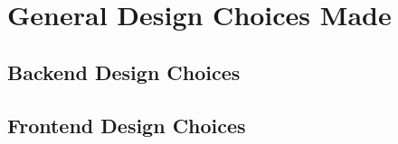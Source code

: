 \section[General Design Choices Made]{General Design Choices Made}\label{sec:newsec}

\subsection{Backend Design Choices}
\subsection{Frontend Design Choices}